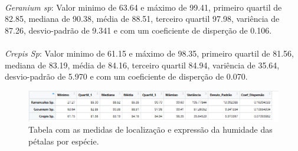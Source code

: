 \documentclass{article}
\begin{document}
\paragraph{} \textit{Geranium sp}: Valor minimo de 63.64 e máximo de 99.41, primeiro quartil de 82.85, mediana de 90.38, média de 88.51,  terceiro quartil 97.98, variência de 87.26, desvio-padrão de 9.341 e com um coeficiente de disperção de 0.106.

\paragraph{} \textit{Crepis Sp}: Valor minimo de 61.15 e máximo de 98.35, primeiro quartil de 81.56, mediana de 83.19, média de 84.16,  terceiro quartil 84.94, variência de 35.64, desvio-padrão de 5.970 e com um coeficiente de disperção de 0.070.

\begin{figure}[h]
       \centering %
        \includegraphics[scale=0.8]{tabela_humidade_especie.png}
       \caption{Tabela com as medidas de localização e expressão da humidade das pétalas por espécie.}
       \label{fig:logo}
    \end{figure}
\paragraph{}
\paragraph{}
\paragraph{}
\paragraph{}
\paragraph{}
\paragraph{}
\paragraph{}
\end{document}
